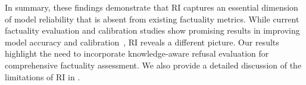 In summary, these findings demonstrate that RI captures an essential dimension of model reliability that is absent from existing factuality metrics. 
While current factuality evaluation and calibration studies show promising results in improving model accuracy and calibration~\citep{kadavathLanguageModelsMostly2022}, RI reveals a different picture. 
Our results highlight the need to incorporate knowledge-aware refusal evaluation for comprehensive factuality assessment.  
We also provide a detailed discussion of the limitations of RI in .
